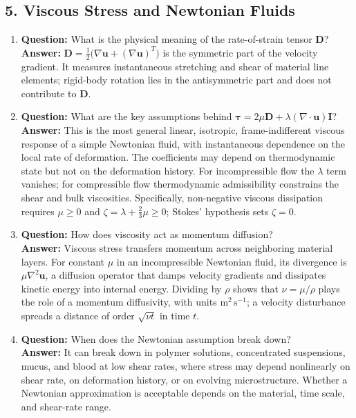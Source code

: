 \documentclass[12pt]{article}
\begin{document}
\subsection*{5. Viscous Stress and Newtonian Fluids}
\begin{enumerate}
\item \textbf{Question:} What is the physical meaning of the rate-of-strain tensor $\mathbf{D}$?\\
\textbf{Answer:} $\mathbf{D}=\tfrac12\bigl(\nabla\mathbf{u}+(\nabla\mathbf{u})^{T}\bigr)$ is the symmetric part of the velocity gradient. It measures instantaneous stretching and shear of material line elements; rigid-body rotation lies in the antisymmetric part and does not contribute to $\mathbf{D}$.

\item \textbf{Question:} What are the key assumptions behind $\boldsymbol{\tau} = 2\mu \mathbf{D} + \lambda (\nabla \cdot \mathbf{u})\mathbf{I}$?\\
\textbf{Answer:} This is the most general linear, isotropic, frame-indifferent viscous response of a simple Newtonian fluid, with instantaneous dependence on the local rate of deformation. The coefficients may depend on thermodynamic state but not on the deformation history. For incompressible flow the $\lambda$ term vanishes; for compressible flow thermodynamic admissibility constrains the shear and bulk viscosities.
Specifically, non-negative viscous dissipation requires $\mu\ge0$ and $\zeta=\lambda+\tfrac23\mu\ge0$; Stokes' hypothesis sets $\zeta=0$.

\item \textbf{Question:} How does viscosity act as momentum diffusion?\\
\textbf{Answer:} Viscous stress transfers momentum across neighboring material layers. For constant $\mu$ in an incompressible Newtonian fluid, its divergence is $\mu\nabla^2\mathbf{u}$, a diffusion operator that damps velocity gradients and dissipates kinetic energy into internal energy.
Dividing by $\rho$ shows that $\nu=\mu/\rho$ plays the role of a momentum diffusivity, with units $\mathrm{m^2\,s^{-1}}$; a velocity disturbance spreads a distance of order $\sqrt{\nu t}$ in time $t$.

\item \textbf{Question:} When does the Newtonian assumption break down?\\
\textbf{Answer:} It can break down in polymer solutions, concentrated suspensions, mucus, and blood at low shear rates, where stress may depend nonlinearly on shear rate, on deformation history, or on evolving microstructure. Whether a Newtonian approximation is acceptable depends on the material, time scale, and shear-rate range.
\end{enumerate}
\end{document}
